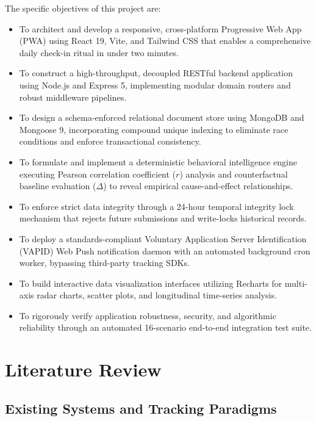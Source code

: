 The specific objectives of this project are:
\begin{itemize}
  \item To architect and develop a responsive, cross-platform Progressive Web App (PWA) using React 19, Vite, and Tailwind CSS that enables a comprehensive daily check-in ritual in under two minutes.
  \item To construct a high-throughput, decoupled RESTful backend application using Node.js and Express 5, implementing modular domain routers and robust middleware pipelines.
  \item To design a schema-enforced relational document store using MongoDB and Mongoose 9, incorporating compound unique indexing to eliminate race conditions and enforce transactional consistency.
  \item To formulate and implement a deterministic behavioral intelligence engine executing Pearson correlation coefficient ($r$) analysis and counterfactual baseline evaluation ($\Delta$) to reveal empirical cause-and-effect relationships.
  \item To enforce strict data integrity through a 24-hour temporal integrity lock mechanism that rejects future submissions and write-locks historical records.
  \item To deploy a standards-compliant Voluntary Application Server Identification (VAPID) Web Push notification daemon with an automated background cron worker, bypassing third-party tracking SDKs.
  \item To build interactive data visualization interfaces utilizing Recharts for multi-axis radar charts, scatter plots, and longitudinal time-series analysis.
  \item To rigorously verify application robustness, security, and algorithmic reliability through an automated 16-scenario end-to-end integration test suite.
\end{itemize}


\chapter{Literature Review}
\label{Chapter2}

\section{Existing Systems and Tracking Paradigms}

